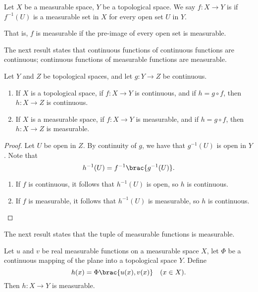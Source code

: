 \begin{definition}
Let $X$ be a measurable space, $Y$ be a topological space. We say $f\colon X\to Y$ is  if $f^{-1}(U)$ is a measurable set in $X$ for every open set $U$ in $Y$.
\end{definition}

That is, $f$ is measurable if the pre-image of every open set is measurable.

The next result states that continuous functions of continuous functions are continuous; continuous functions of measurable functions are measurable.

\begin{lemma}\label{lemma:composition-continuity}
Let $Y$ and $Z$ be topological spaces, and let $g\colon Y\to Z$ be continuous.
\begin{enumerate}[label=(\roman*)]
\item If $X$ is a topological space, if $f\colon X\to Y$ is continuous, and if $h=g\circ f$, then $h\colon X\to Z$ is continuous.
\item If $X$ is a measurable space, if $f\colon X\to Y$ is measurable, and if $h=g\circ f$, then $h\colon X\to Z$ is measurable.
\end{enumerate}
\end{lemma}

\begin{proof}
Let $U$ be open in $Z$. By continuity of $g$, we have that $g^{-1}(U)$ is open in $Y$. Note that
\[h^{-1}(U)=f^{-1}\brac{g^{-1}(U)}.\]
\begin{enumerate}[label=(\roman*)]
\item If $f$ is continuous, it follows that $h^{-1}(U)$ is open, so $h$ is continuous.
\item If $f$ is measurable, it follows that $h^{-1}(U)$ is measurable, so $h$ is continuous.
\end{enumerate}
\end{proof}

The next result states that the tuple of measurable functions is measurable.

\begin{lemma}\label{lemma:tuple-measurable-function}
Let $u$ and $v$ be real measurable functions on a measurable space $X$, let $\Phi$ be a continuous mapping of the plane into a topological space $Y$. Define
\[h(x)=\Phi\brac{u(x),v(x)}\quad(x\in X).\]
Then $h\colon X\to Y$ is measurable.
\end{lemma}

